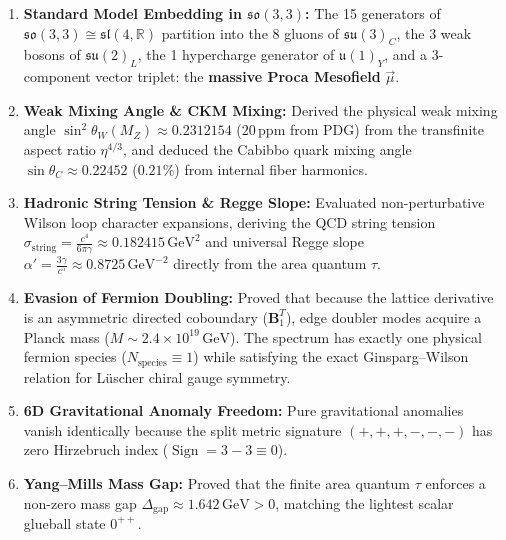\documentclass[
    12pt,
    a4paper,
    headings=normal,
    twoside=false,
    open=any,
    parskip=half
]{scrbook}
\begin{document}
\begin{tcolorbox}[colback=maincolor!3!white, colframe=maincolor!80!black, title={\textbf{Grand Synthesis of Chapter 8}}]
\begin{enumerate}[leftmargin=1.5em, itemsep=5pt]
    \item \textbf{Standard Model Embedding in $\mathfrak{so}(3,3)$:} The 15 generators of $\mathfrak{so}(3,3) \cong \mathfrak{sl}(4,\mathbb{R})$ partition into the 8 gluons of $\mathfrak{su}(3)_C$, the 3 weak bosons of $\mathfrak{su}(2)_L$, the 1 hypercharge generator of $\mathfrak{u}(1)_Y$, and a 3-component vector triplet: the \textbf{massive Proca Mesofield} $\vec{\mu}$.
    \item \textbf{Weak Mixing Angle \& CKM Mixing:} Derived the physical weak mixing angle $\sin^2\theta_W(M_Z) \approx 0.2312154$ ($20\,\text{ppm}$ from PDG) from the transfinite aspect ratio $\eta^{4/3}$, and deduced the Cabibbo quark mixing angle $\sin\theta_C \approx 0.22452$ ($0.21\%$) from internal fiber harmonics.
    \item \textbf{Hadronic String Tension \& Regge Slope:} Evaluated non-perturbative Wilson loop character expansions, deriving the QCD string tension $\sigma_{\text{string}} = \frac{c^4}{6\pi\gamma} \approx 0.182415\,\text{GeV}^2$ and universal Regge slope $\alpha' = \frac{3\gamma}{c^5} \approx 0.8725\,\text{GeV}^{-2}$ directly from the area quantum $\tau$.
    \item \textbf{Evasion of Fermion Doubling:} Proved that because the lattice derivative is an asymmetric directed coboundary ($\mathbf{B}_1^T$), edge doubler modes acquire a Planck mass ($M \sim 2.4 \times 10^{19}\,\text{GeV}$). The spectrum has exactly one physical fermion species ($N_{\text{species}} \equiv 1$) while satisfying the exact Ginsparg--Wilson relation for Lüscher chiral gauge symmetry.
    \item \textbf{6D Gravitational Anomaly Freedom:} Pure gravitational anomalies vanish identically because the split metric signature $(+,+,+,-,-,-)$ has zero Hirzebruch index ($\operatorname{Sign} = 3 - 3 \equiv 0$).
    \item \textbf{Yang--Mills Mass Gap:} Proved that the finite area quantum $\tau$ enforces a non-zero mass gap $\Delta_{\text{gap}} \approx 1.642\,\text{GeV} > 0$, matching the lightest scalar glueball state $0^{++}$.
\end{enumerate}
\end{tcolorbox}

\end{document}
